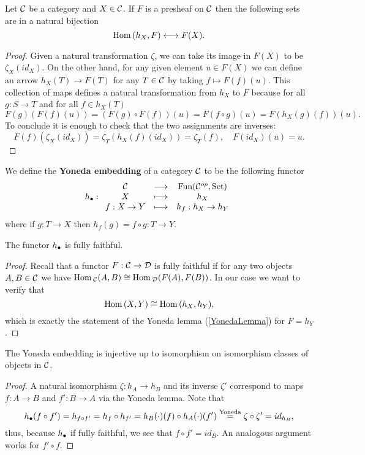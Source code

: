 \begin{lemma}\label{YonedaLemma}
Let $\mathcal{C}$ be a category and $X\in \mathcal{C}$. If $F$ is a presheaf on $\mathcal{C}$ then the following sets are in a natural bijection
\[\mathrm{Hom}\,(h_X,F)\longleftrightarrow F(X).\]
\end{lemma}
\begin{proof}
Given a natural transformation $\zeta$, we can take its image in $F(X)$ to be $\zeta_X(id_X)$.
On the other hand, for any given element $u\in F(X)$ we can define an arrow $h_X(T)\to F(T)$ for any $T\in \mathcal{C}$ by taking $f\mapsto F(f)(u)$. This collection of maps defines a natural transformation from $h_X$ to $F$ because for all $g:S\to T$ and for all $f\in h_X(T)$
\[F(g)(F(f)(u))=(F(g)\circ F(f))(u)=F(f\circ g)(u)=F(h_X(g)(f))(u).\]
To conclude it is enough to check that the two assignments are inverses:
\[F(f)(\zeta_X(id_X))=\zeta_T(h_X(f)(id_X))=\zeta_T(f),\quad F(id_X)(u)=u.\]
\end{proof}

\begin{definition}
We define the \textbf{Yoneda embedding} of a category $\mathcal{C}$ to be the following functor
\[{h_\bullet}:\begin{array}{ccc} {\mathcal{C}} & \longrightarrow & {\mathrm{Fun}(\mathcal{C}^{op},\mathrm{Set})}\\ {X} & \longmapsto & {h_X}\\ {f:X\to Y} & \longmapsto & {h_f:h_X\to h_Y} \end{array}\]
where if $g:T\to X$ then $h_f(g)=f\circ g:T\to Y$.
\end{definition}


\begin{proposition}
The functor ${h_\bullet}$ is fully faithful.
\end{proposition}
\begin{proof}
Recall that a functor $F:\mathcal{C}\to \mathcal{D}$ is fully faithful if for any two objects $A,B\in\mathcal{C}$ we have $\mathrm{Hom}\,_{\mathcal{C}}(A,B)\cong \mathrm{Hom}\,_{\mathcal{D}}(F(A),F(B))$. In our case we want to verify that
\[\mathrm{Hom}\,(X,Y)\cong\mathrm{Hom}\,(h_X,h_Y),\]
which is exactly the statement of the Yoneda lemma (\ref{YonedaLemma}) for $F=h_Y$.
\end{proof}
\begin{proposition}\label{YonedaEmbeddingInjectiveOnIsoClasses}
The Yoneda embedding is injective up to isomorphism on isomorphism classes of objects in $\mathcal{C}$.
\end{proposition}
\begin{proof}
A natural isomorphism $\zeta:h_A\to h_B$ and its inverse $\zeta'$ correspond to maps $f:A\to B$ and $f':B\to A$ via the Yoneda lemma. Note that
\[{h_\bullet}(f\circ f')=h_{f\circ f'}=h_f\circ h_{f'}=h_B(\cdot)(f)\circ h_A(\cdot)(f')\overset{\text{Yoneda}}=\zeta\circ \zeta'=id_{h_B},\]
thus, because ${h_\bullet}$ if fully faithful, we see that $f\circ f'=id_B$. An analogous argument works for $f'\circ f$.
\end{proof}

